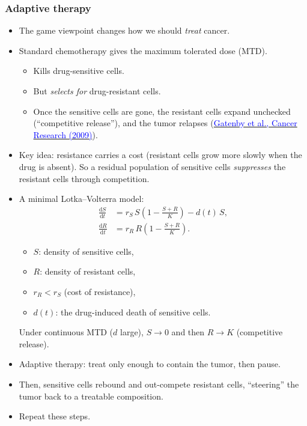 \documentclass[20pt]{extarticle}
\newcommand{\hrefc}[2]{\href{#1}{\textcolor{blue}{#2}}}
\begin{document}
\clearpage

\subsubsection*{Adaptive therapy}

\begin{itemize}
\item The game viewpoint changes how we should \emph{treat} cancer.
\item Standard chemotherapy gives the maximum tolerated dose (MTD).
	\begin{itemize}
	\item Kills drug-sensitive cells.
	\item But \emph{selects for} drug-resistant cells.
	\item Once the sensitive cells are gone, the resistant cells expand unchecked (``competitive release''), and the tumor relapses (\hrefc{https://doi.org/10.1158/0008-5472.CAN-08-3658}{Gatenby et al., Cancer Research (2009)}).
	\end{itemize}
\item Key idea: resistance carries a cost (resistant cells grow more slowly when the drug is absent). So a residual population of sensitive cells \emph{suppresses} the resistant cells through competition.
\item A minimal Lotka--Volterra model:
\[
\begin{aligned}
\frac{\text{d}S}{\text{d}t} &= r_S\, S\left(1 - \frac{S + R}{K}\right) - d(t)\, S,\\
\frac{\text{d}R}{\text{d}t} &= r_R\, R\left(1 - \frac{S + R}{K}\right).
\end{aligned}
\]
\begin{itemize}
\item $S$: density of sensitive cells,
\item $R$: density of resistant cells,
\item $r_R < r_S$ (cost of resistance),
\item $d(t)$: the drug-induced death of sensitive cells.
\end{itemize}
Under continuous MTD ($d$ large), $S\to0$ and then $R\to K$ (competitive release).
\item Adaptive therapy: treat only enough to contain the tumor, then pause.
\item Then, sensitive cells rebound and out-compete resistant cells, ``steering'' the tumor back to a treatable composition.
\item Repeat these steps.

\end{itemize}
\end{document}
